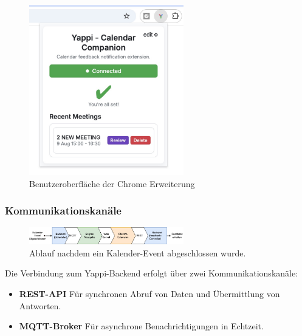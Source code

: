 \documentclass[12pt,a4paper]{report}
\begin{document}
            \begin{figure}[H]
              \centering
              \includegraphics[width=0.60\textwidth]{../figures/yappi-chrome-extension/yappi-extension-popup.jpg}
              \caption{Benutzeroberfläche der Chrome Erweiterung}
              \label{fig:yappi-extension-popup}
            \end{figure}


    \subsubsection{Kommunikationskanäle}

        \begin{figure}[H]
            \centering
            \includegraphics[width=0.60\textwidth]{../figures/yappi-chrome-extension/communication-calendar-notify.drawio.png}
            \caption{Ablauf nachdem ein Kalender-Event abgeschlossen wurde.}
            \label{fig:communication-calendar-notify}
        \end{figure}

        Die Verbindung zum Yappi-Backend erfolgt über zwei Kommunikationskanäle:
        \begin{itemize}
          \item \textbf{REST-API} Für synchronen Abruf von Daten und Übermittlung von Antworten.
          \item \textbf{MQTT-Broker} Für asynchrone Benachrichtigungen in Echtzeit.
        \end{itemize}
\end{document}
